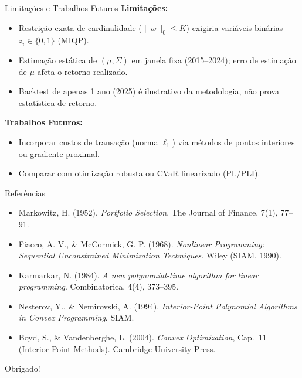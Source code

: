 \documentclass[aspectratio=43]{beamer}
\begin{document}
\begin{frame}{Limitações e Trabalhos Futuros}
  \textbf{Limitações:}
  \begin{itemize}
    \item Restrição exata de cardinalidade ($\|w\|_0 \le K$) exigiria variáveis binárias $z_i \in \{0,1\}$ (MIQP).
    \item Estimação estática de $(\mu, \Sigma)$ em janela fixa (2015--2024); erro de estimação de $\mu$ afeta o retorno realizado.
    \item Backtest de apenas 1 ano (2025) é ilustrativo da metodologia, não prova estatística de retorno.
  \end{itemize}

  \vspace{0.25cm}
  \textbf{Trabalhos Futuros:}
  \begin{itemize}
    \item Incorporar custos de transação (norma $\ell_1$) via métodos de pontos interiores ou gradiente proximal.
    \item Comparar com otimização robusta ou CVaR linearizado (PL/PLI).
  \end{itemize}
\end{frame}

\begin{frame}{Referências}
  \scriptsize
  \begin{itemize}
    \item Markowitz, H. (1952). \emph{Portfolio Selection}. The Journal of Finance, 7(1), 77--91.
    \item Fiacco, A. V., \& McCormick, G. P. (1968). \emph{Nonlinear Programming: Sequential Unconstrained Minimization Techniques}. Wiley (SIAM, 1990).
    \item Karmarkar, N. (1984). \emph{A new polynomial-time algorithm for linear programming}. Combinatorica, 4(4), 373--395.
    \item Nesterov, Y., \& Nemirovski, A. (1994). \emph{Interior-Point Polynomial Algorithms in Convex Programming}. SIAM.
    \item Boyd, S., \& Vandenberghe, L. (2004). \emph{Convex Optimization}, Cap.~11 (Interior-Point Methods). Cambridge University Press.
  \end{itemize}
\end{frame}

\begin{frame}
  \centering
  \Huge Obrigado!
\end{frame}
\end{document}
